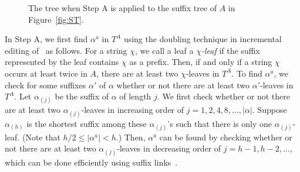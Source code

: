 \documentclass{llncs}
\begin{document}
\begin{figure}[t]
{
 }
\caption{The tree when Step A is applied to the suffix tree of $A$ in Figure~\ref{fig:ST}.
\label{fig:ST-A-S1}}
\end{figure}

In Step A, we first find $\alpha^{a}$ in $T^A$ using the doubling technique
 in incremental editing of~\cite{McCreight:76} as follows.
For a string $\chi$, we call a leaf a {\em $\chi$-leaf}
 if the suffix represented by the leaf contains $\chi$ as a prefix.
Then, if and only if a string $\chi$ occurs at least twice in $A$,
 there are at least two $\chi$-leaves in $T^A$.
To find $\alpha^{a}$,
 we check for some suffixes $\alpha'$ of $\alpha$
 whether or not there are at least two $\alpha'$-leaves in $T^A$.
Let $\alpha_{(j)}$ be the suffix of $\alpha$ of length $j$.
We first check whether or not there are at least two $\alpha_{(j)}$-leaves
 in increasing order of $j=1,2,4,8,\ldots, |\alpha|$.
Suppose $\alpha_{(h)}$ is the shortest suffix among these $\alpha_{(j)}$'s such that there is only one $\alpha_{(j)}$-leaf.
(Note that $h/2 \le |\alpha^{a}| < h $.)
Then, $\alpha^{a}$ can be found
 by checking whether or not there are at least two $\alpha_{(j)}$-leaves
 in decreasing order of $j=h-1, h-2, \ldots$,
 which can be done efficiently using suffix links~\cite{McCreight:76}.
\end{document}
